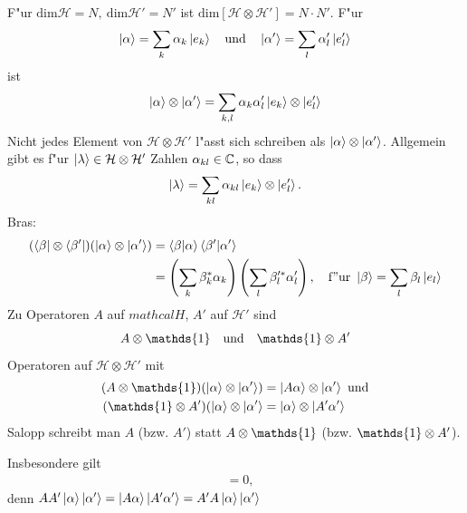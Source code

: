 \documentclass[a4paper]{scrartcl}
\newcommand{\CC}{\ensuremath \mathbb{C}}
\newcommand{\dOne}{\ensuremath \mathds{1}}
\begin{document}
{F"ur $\mathrm{dim} \mathcal H = N, \ \mathrm{dim} \mathcal H' = N'$ ist $\mathrm{dim} \left[ \mathcal H \otimes \mathcal H' \right] = N \cdot N'$. F"ur
$$\ket{\alpha} = \sum_k \alpha_k \ket{e_k} \quad \mathrm{und} \quad \ket{\alpha'} = \sum_l \alpha_l' \ket{e_l'}$$
ist
\begin{align}
\ket \alpha \otimes \ket{ \alpha'} = \sum_{k,l} \alpha_k \alpha_l' \ket{e_k} \otimes \ket{e_l'}
\end{align}
Nicht jedes Element von $\mathcal H \otimes \mathcal H'$ l"asst sich schreiben als $\ket \alpha \otimes \ket{\alpha'}$. Allgemein gibt es f"ur $\ket \lambda \in \mathcal H \otimes \mathcal H'$ Zahlen $\alpha_{kl} \in \CC$, so dass
\begin{align}
\ket \lambda = \sum_{kl} \alpha_{kl} \ket{e_k} \otimes \ket{e_l'}.
\end{align}
Bras:
\begin{align}
\begin{split}
( \bra \beta \otimes \bra{\beta'})(\ket \alpha \otimes \ket{\alpha'}) & = \braket{ \beta | \alpha} \braket{ \beta' | \alpha'} \\
& = \left( \sum_k \beta_k^* \alpha_k \right) \left( \sum_l \beta_l'^* \alpha_l' \right), \quad \mathrm{f"ur \ } \ket \beta = \sum_l \beta_l \ket{e_l}
\end{split}
\end{align}
Zu Operatoren $A$ auf $mathcal H$, $A'$ auf $\mathcal H'$ sind 
$$A \otimes \dOne \quad \mathrm{und} \quad \dOne \otimes A'$$
Operatoren auf $\mathcal H \otimes \mathcal H'$ mit
\begin{align}
\begin{split}
(A \otimes \dOne)( \ket \alpha \otimes \ket{\alpha'}) & = \ket{A \alpha} \otimes \ket{\alpha'} \ \mathrm{und} \\
( \dOne \otimes A')(\ket \alpha \otimes \ket{\alpha'} & = \ket \alpha \otimes \ket{ A' \alpha'}
\end{split}
\end{align}
Salopp schreibt man $A$ (bzw. $A'$) statt $A \otimes \dOne$ (bzw. $\dOne \otimes A'$). 

Insbesondere gilt
\begin{align} [ A, A'] & = 0, \end{align}
denn $A A' \ket \alpha \ket{\alpha'} = \ket{ A \alpha }\ket{ A' \alpha'} = A'A \ket \alpha \ket{\alpha'}$

}
\end{document}
